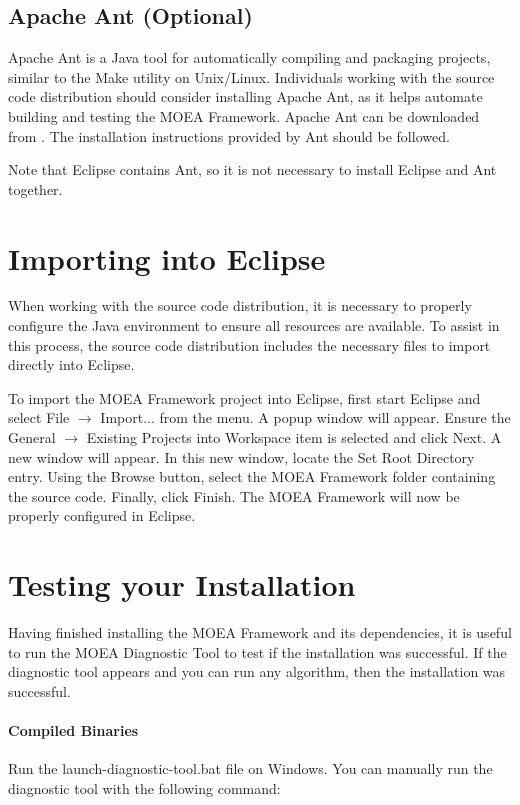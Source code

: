\subsection{Apache Ant (Optional)}
Apache Ant is a Java tool for automatically compiling and packaging projects, similar to the Make utility on Unix/Linux.  Individuals working with the source code distribution should consider installing Apache Ant, as it helps automate building and testing the MOEA Framework.  Apache Ant can be downloaded from .  The installation instructions provided by Ant should be followed.

Note that Eclipse contains Ant, so it is not necessary to install Eclipse and Ant together.

\section{Importing into Eclipse}
When working with the source code distribution, it is necessary to properly configure the Java environment to ensure all resources are available.  To assist in this process, the source code distribution includes the necessary files to import directly into Eclipse.

To import the MOEA Framework project into Eclipse, first start Eclipse and select File $\rightarrow$ Import... from the menu.  A popup window will appear.  Ensure the General $\rightarrow$ Existing Projects into Workspace item is selected and click Next.  A new window will appear.  In this new window, locate the Set Root Directory entry.  Using the Browse button, select the MOEA Framework folder containing the source code.  Finally, click Finish.  The MOEA Framework will now be properly configured in Eclipse.

\section{Testing your Installation}
Having finished installing the MOEA Framework and its dependencies, it is useful to run the MOEA Diagnostic Tool to test if the installation was successful.  If the diagnostic tool appears and you can run any algorithm, then the installation was successful.

\paragraph{Compiled Binaries}
Run the launch-diagnostic-tool.bat file on Windows.  You can manually run the diagnostic tool with the following command:


